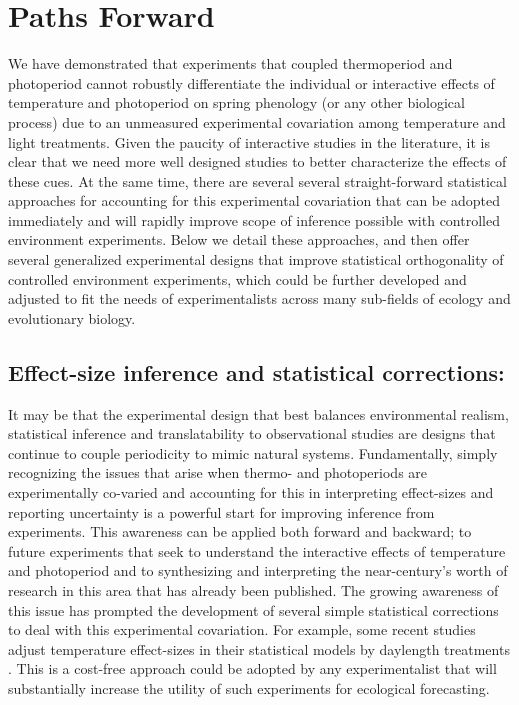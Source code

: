 \documentclass[11pt]{article}
\begin{document}
\section*{Paths Forward}
We have demonstrated that experiments that coupled thermoperiod and photoperiod cannot robustly differentiate the individual or interactive effects of temperature and photoperiod on spring phenology (or any other biological process) due to an unmeasured experimental covariation among temperature and light treatments. Given the paucity of interactive studies in the literature, it is clear that we need more well designed studies to better characterize the effects of these cues. At the same time, there are several several straight-forward statistical approaches for accounting for this experimental covariation that can be adopted immediately and will rapidly improve scope  of inference possible with controlled environment experiments. Below we detail these approaches, and then offer several generalized experimental designs that improve statistical orthogonality of controlled environment experiments, which could be further developed and adjusted to fit the needs of experimentalists across many sub-fields of ecology and evolutionary biology. 

\subsection*{Effect-size inference and statistical corrections:}
It may be that the experimental design that best balances environmental realism, statistical inference and translatability to observational studies are designs that continue to couple periodicity to mimic natural systems. Fundamentally, simply recognizing the issues that arise when thermo- and photoperiods are experimentally co-varied and accounting for this in interpreting effect-sizes and reporting uncertainty is a powerful start for improving inference from experiments. This awareness can be applied both forward and backward; to future experiments that seek to understand the interactive effects of temperature and photoperiod and to synthesizing and interpreting the near-century's worth of research in this area that has already been published. The growing awareness of this issue has prompted the development of several simple statistical corrections to deal with this experimental covariation. For example, some recent studies adjust temperature effect-sizes in their statistical models by daylength treatments \citep[e.g.,][]{Ettinger:2020aa}. This is a cost-free approach could be adopted by any experimentalist that will substantially increase the utility of such experiments for ecological forecasting.
\end{document}
